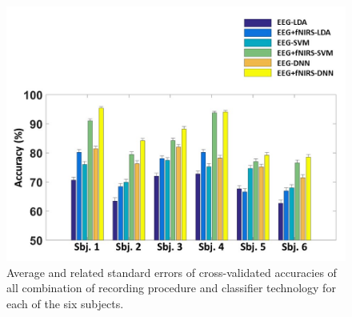 \documentclass[12pt ]{iopart}
\begin{document}
\begin{figure}
	\includegraphics[width=\linewidth]{Slide6.JPG}
	\caption{Average and related standard errors of cross-validated accuracies of all combination of recording procedure and classifier technology for each of the six subjects.}
	\label{fig:fig6}
\end{figure}
\end{document}
